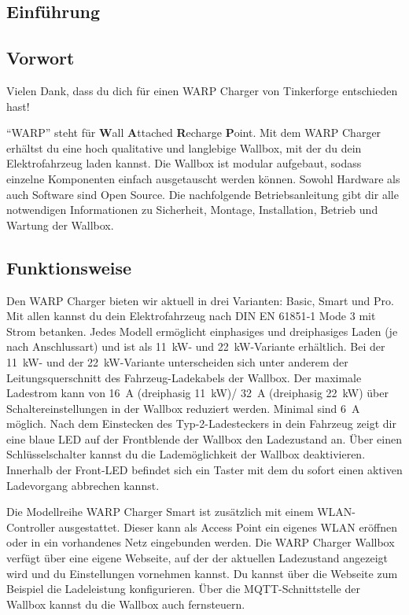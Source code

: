 \documentclass[a4paper,10pt]{article}
\begin{document}
\begin{multicols*}{2}
	\tableofcontents \section{Einführung}
	\subsection{Vorwort} Vielen Dank, dass du
	dich für einen WARP Charger von Tinkerforge entschieden hast!

	\enquote{WARP} steht
	für \textbf{W}all \textbf{A}ttached
	\textbf{R}echarge \textbf{P}oint. Mit dem WARP Charger
	erhältst du eine hoch qualitative und langlebige Wallbox, mit der du dein
	Elektrofahrzeug laden kannst. Die Wallbox ist modular aufgebaut, sodass
	einzelne Komponenten einfach ausgetauscht werden können. Sowohl Hardware als
	auch Software sind Open Source. Die nachfolgende Betriebsanleitung gibt dir
	alle notwendigen Informationen zu Sicherheit, Montage, Installation, Betrieb
	und Wartung der Wallbox.

	\subsection{Funktionsweise}
	Den WARP Charger bieten wir aktuell in drei Varianten: Basic, Smart und Pro.
	Mit allen kannst du dein Elektrofahrzeug nach DIN EN 61851‐1 Mode 3 mit Strom
	betanken. Jedes Modell ermöglicht einphasiges und dreiphasiges Laden (je nach
	Anschlussart) und ist als \SI{11}{\kilo\watt}- und
	\SI{22}{\kilo\watt}-Variante erhältlich. Bei der \SI{11}{\kilo\watt}- und
	der \SI{22}{\kilo\watt}-Variante unterscheiden sich unter anderem der
	Leitungsquerschnitt des Fahrzeug-Ladekabels der Wallbox. Der maximale Ladestrom
	kann von \SI{16}{\ampere}
	(dreiphasig \SI{11}{\kilo\watt})/ \SI{32}{\ampere} (dreiphasig \SI{22}{\kilo\watt}) über
	Schaltereinstellungen in der Wallbox reduziert werden. Minimal sind
	\SI{6}{\ampere} möglich. Nach dem Einstecken des Typ-2-Ladesteckers in
	dein Fahrzeug zeigt dir eine blaue LED auf der Frontblende der Wallbox den
	Ladezustand an. Über einen Schlüsselschalter kannst du die Lademöglichkeit der
	Wallbox deaktivieren. Innerhalb der Front-LED befindet sich ein Taster mit dem
	du sofort einen aktiven Ladevorgang abbrechen kannst.

	Die Modellreihe WARP Charger Smart ist zusätzlich mit einem WLAN-Controller
	ausgestattet. Dieser kann als Access Point ein eigenes WLAN eröffnen oder in
	ein vorhandenes Netz eingebunden werden. Die WARP Charger Wallbox verfügt über
	eine eigene Webseite, auf der der aktuellen Ladezustand angezeigt wird und du
	Einstellungen vornehmen kannst. Du kannst über die Webseite zum Beispiel die
	Ladeleistung konfigurieren. Über die MQTT-Schnittstelle der Wallbox kannst du
	die Wallbox auch fernsteuern.


\end{multicols*}
\end{document}
